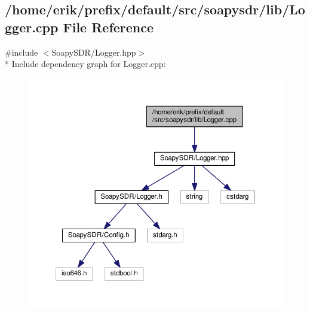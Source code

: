 \subsection{/home/erik/prefix/default/src/soapysdr/lib/\+Logger.cpp File Reference}
\label{soapysdr_2lib_2Logger_8cpp}
{\ttfamily \#include $<$Soapy\+S\+D\+R/\+Logger.\+hpp$>$}\\*
Include dependency graph for Logger.\+cpp\+:
\nopagebreak
\begin{figure}[H]
\begin{center}
\leavevmode
\includegraphics[width=350pt]{df/d75/soapysdr_2lib_2Logger_8cpp__incl}
\end{center}
\end{figure}
